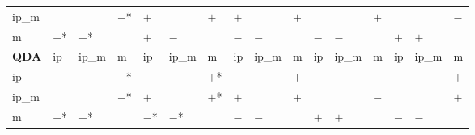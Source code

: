 \begin{table}[htbp]
{\begin{tabular}{l|lll|lll|lll|lll|lll}
ip\_m        &            &            & $-$*       & $+$        &            & $+$        & $+$        &            & $+$        &            &            & $+$        &            &            & $-$         \\
m            & $+$*       & $+$*       &            & $+$        & $-$        &            & $-$        & $-$        &            & $-$        & $-$        &            & $+$        & $+$        &             \\
\hline
\textbf{QDA} & ip         & ip\_m      & m          & ip         & ip\_m      & m          & ip         & ip\_m      & m          & ip         & ip\_m      & m          & ip         & ip\_m      & m           \\
\hline
ip           &            &            & $-$*       &            & $-$        & $+$*       &            & $-$        & $+$        &            &            & $-$        &            &            & $+$         \\
ip\_m        &            &            & $-$*       & $+$        &            & $+$*       & $+$        &            & $+$        &            &            & $-$        &            &            & $+$         \\
m            & $+$*       & $+$*       &            & $-$*       & $-$*       &            & $-$        & $-$        &            & $+$        & $+$        &            & $-$        & $-$        &             \\
\hline
\hline
\end{tabular}

  }
\end{table}




